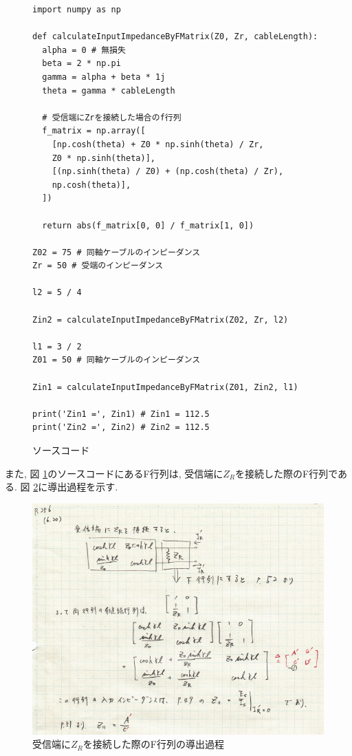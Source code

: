 \documentclass[a4j,12pt,]{jarticle}
\begin{document}
\begin{figure}[H]
  \begin{center}
    \begin{screen}
      \begin{verbatim}
import numpy as np

def calculateInputImpedanceByFMatrix(Z0, Zr, cableLength):
  alpha = 0 # 無損失
  beta = 2 * np.pi
  gamma = alpha + beta * 1j
  theta = gamma * cableLength
  
  # 受信端にZrを接続した場合のf行列
  f_matrix = np.array([
    [np.cosh(theta) + Z0 * np.sinh(theta) / Zr,
    Z0 * np.sinh(theta)],
    [(np.sinh(theta) / Z0) + (np.cosh(theta) / Zr),
    np.cosh(theta)],
  ])
  
  return abs(f_matrix[0, 0] / f_matrix[1, 0])

Z02 = 75 # 同軸ケーブルのインピーダンス
Zr = 50 # 受端のインピーダンス

l2 = 5 / 4

Zin2 = calculateInputImpedanceByFMatrix(Z02, Zr, l2)

l1 = 3 / 2
Z01 = 50 # 同軸ケーブルのインピーダンス

Zin1 = calculateInputImpedanceByFMatrix(Z01, Zin2, l1)

print('Zin1 =', Zin1) # Zin1 = 112.5
print('Zin2 =', Zin2) # Zin2 = 112.5
\end{verbatim}
    \end{screen}
    \caption{ソースコード}
    \label{sc1}
  \end{center}
\end{figure}

また, 図 \ref{sc1}のソースコードにあるF行列は, 受信端に$Z_R$を接続した際のF行列である.
図 \ref{p2}に導出過程を示す.

\begin{figure}[H]
  \begin{center}
 \includegraphics[width=160mm]{fmatrix.png}
 \caption{受信端に$Z_R$を接続した際のF行列の導出過程}
 \label{p2}
 \end{center}
 \end{figure}
\end{document}
